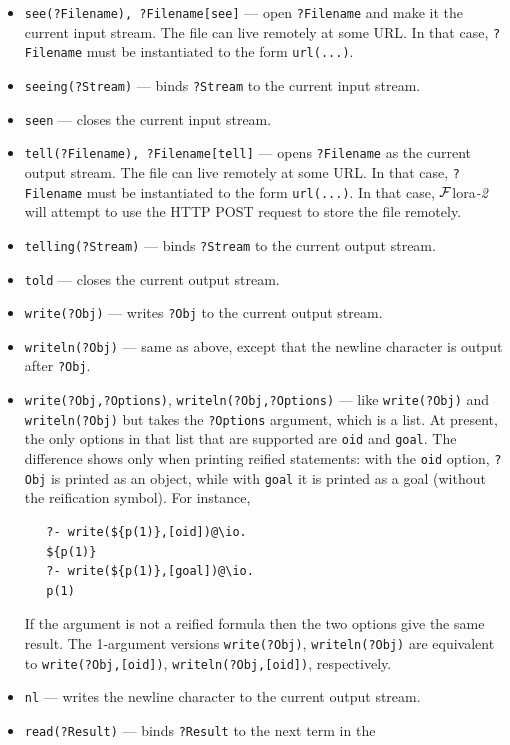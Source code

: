 \documentclass[11pt]{article}
\newcommand{\FLORA}{{\mbox{\sc ${\cal F}${lora}\rm\emph{-2}}}\xspace}
\newcommand{\FLSYSTEM}{\FLORA}
\begin{document}
\begin{itemize}
\item  {\tt see(?Filename), ?Filename[see]} --- open {\tt ?Filename} and
  make it the current input stream.
  The file can live remotely at some URL. In that case, {\tt ?Filename}
  must be instantiated to the form {\tt url(...)}.  
\item {\tt seeing(?Stream)} --- binds {\tt ?Stream} to the current input
  stream.
\item {\tt seen} --- closes the current input stream.
\item {\tt tell(?Filename), ?Filename[tell]} --- opens {\tt ?Filename} as the current output
  stream. The file can live remotely at some URL. In that case, {\tt ?Filename}
  must be instantiated to the form {\tt url(...)}.
  In that case, \FLSYSTEM will attempt to use the HTTP POST request to store
  the file remotely.
\item {\tt telling(?Stream)} --- binds {\tt ?Stream} to the current output
  stream. 
\item {\tt told} --- closes the current output stream.
\item {\tt write(?Obj)} --- writes {\tt ?Obj} to the current output stream.
\item {\tt writeln(?Obj)} --- same as above,
  except that the newline character is output after {\tt ?Obj}.
\item {\tt write(?Obj,?Options)}, \texttt{writeln(?Obj,?Options)} ---  like
  \texttt{write(?Obj)} and \texttt{writeln(?Obj)} but takes the
  \texttt{?Options} argument, which is a list. At present, the only options
  in that list that are supported are \texttt{oid} and \texttt{goal}.
  The difference shows only when printing reified statements: with the
  \texttt{oid} option, \texttt{?Obj} is printed as an object, while
  with \texttt{goal} it is printed as a goal (without the reification
  symbol). For instance,
\begin{verbatim}
   ?- write(${p(1)},[oid])@\io.
   ${p(1)}
   ?- write(${p(1)},[goal])@\io.
   p(1)
\end{verbatim}
  If the argument is not a reified formula then the two options give the
  same result. The 1-argument versions \texttt{write(?Obj)},
  \texttt{writeln(?Obj)} are equivalent to \texttt{write(?Obj,[oid])},
  \texttt{writeln(?Obj,[oid])}, respectively.
\item {\tt nl} --- writes the newline character to the current output
  stream.
\item {\tt read(?Result)} --- binds {\tt ?Result} to the next term in the

\end{itemize}
\end{document}

